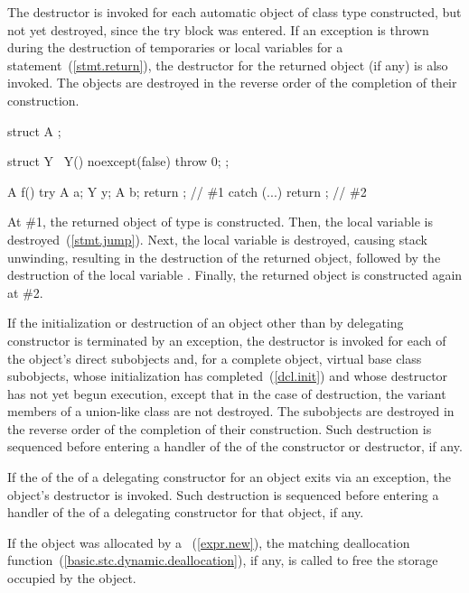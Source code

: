 \pnum
The destructor is invoked for each automatic object of class type constructed,
but not yet destroyed,
since the try block was entered.
If an exception is thrown during the destruction of temporaries or
local variables for a  statement~(\ref{stmt.return}),
the destructor for the returned object (if any) is also invoked.
The objects are destroyed in the reverse order of the completion
of their construction.
\begin{example}
\begin{codeblock}
struct A { };

struct Y { ~Y() noexcept(false) { throw 0; } };

A f() {
  try {
    A a;
    Y y;
    A b;
    return {};   // \#1
  } catch (...) {
  }
  return {};     // \#2
}
\end{codeblock}
At \#1, the returned object of type  is constructed.
Then, the local variable  is destroyed~(\ref{stmt.jump}).
Next, the local variable  is destroyed,
causing stack unwinding,
resulting in the destruction of the returned object,
followed by the destruction of the local variable .
Finally, the returned object is constructed again at \#2.
\end{example}

\pnum
If the initialization or destruction of an object
other than by delegating constructor
is terminated by an exception,
the destructor is invoked for
each of the object's direct subobjects
and, for a complete object, virtual base class subobjects, 
whose initialization has completed~(\ref{dcl.init})
and whose destructor has not yet begun execution,
except that in the case of destruction, the variant members of a
union-like class are not destroyed.
The subobjects are destroyed in the reverse order of the completion of
their construction. Such destruction is sequenced before entering a
handler of the  of the constructor or destructor,
if any.

\pnum
If the 
of the 
of a delegating constructor
for an object exits via
an exception, the object's destructor is invoked.
Such destruction is sequenced before entering a handler of the
 of a delegating constructor for that object, if any.

\pnum
\begin{note}
If the object was allocated by a ~(\ref{expr.new}),
the matching deallocation function~(\ref{basic.stc.dynamic.deallocation}),
if any, is called to free the storage occupied by the object.
\end{note}


